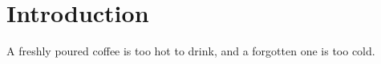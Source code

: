\documentclass{article}
\begin{document}
\section{Introduction}
A freshly poured coffee is too hot to drink,
and a forgotten one is too cold.
\end{document}

